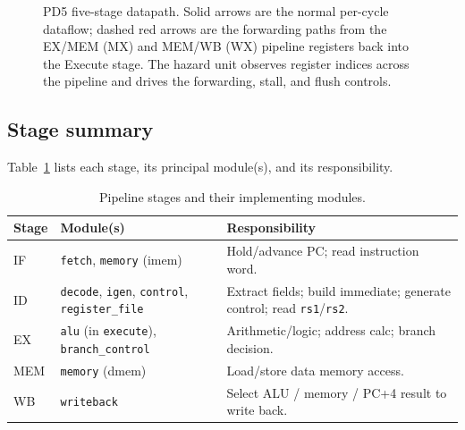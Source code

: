 \documentclass[11pt,a4paper]{article}
\newcommand{\code}[1]{\texttt{#1}}          %
\newcommand{\sig}[1]{\texttt{#1}}
\begin{document}
\begin{figure}[h]
\caption{PD5 five-stage datapath. Solid arrows are the normal per-cycle dataflow; dashed
red arrows are the forwarding paths from the EX/MEM (MX) and MEM/WB (WX) pipeline
registers back into the Execute stage. The hazard unit observes register indices across
the pipeline and drives the forwarding, stall, and flush controls.}
\label{fig:datapath}
\end{figure}

\subsection{Stage summary}
Table~\ref{tab:stages} lists each stage, its principal module(s), and its responsibility.

\begin{table}[h]
\centering
\caption{Pipeline stages and their implementing modules.}
\label{tab:stages}
\small
\begin{tabular}{@{}l l l@{}}
\toprule
\textbf{Stage} & \textbf{Module(s)} & \textbf{Responsibility} \\
\midrule
IF  & \code{fetch}, \code{memory} (imem) & Hold/advance PC; read instruction word. \\
ID  & \code{decode}, \code{igen}, \code{control}, \code{register\_file}
    & Extract fields; build immediate; generate control; read \sig{rs1}/\sig{rs2}. \\
EX  & \code{alu} (in \code{execute}), \code{branch\_control}
    & Arithmetic/logic; address calc; branch decision. \\
MEM & \code{memory} (dmem) & Load/store data memory access. \\
WB  & \code{writeback} & Select ALU / memory / PC+4 result to write back. \\
\bottomrule
\end{tabular}
\end{table}
\end{document}

